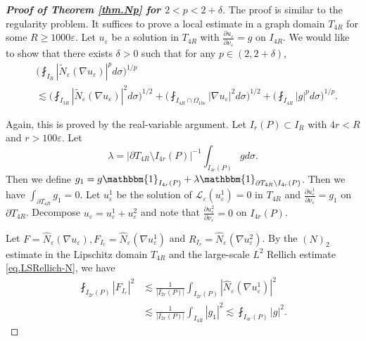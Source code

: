 \documentclass[reqno,12pt]{amsart} %
\theoremstyle{definition}
\theoremstyle{remark}
\numberwithin{equation}{section}
\newcommand{\cL}{\mathcal{L}}
\newcommand{\e}{\varepsilon}
\begin{document}
\begin{proof}[\textbf{Proof of Theorem \ref{thm.Np} for $2<p<2+\delta$}] 
The proof is similar to the regularity problem. It suffices to prove a local estimate in a graph domain $T_{4R}$ for some $R\ge 1000\e$. Let $u_\e$ be a solution in $T_{4R}$ with $\frac{\partial u_\e}{\partial \nu_\e} = g$ on $I_{4R}$. We would like to show that there exists $\delta>0$ such that for any $p\in (2,2+\delta)$,
\begin{equation}
\begin{aligned}
     & \bigg( \fint_{I_R} | \widetilde{N}_\e (\nabla u_\e)|^{p} d\sigma \bigg)^{1/{p}} \\
     & \lesssim \bigg( \fint_{I_{3R}} |\widetilde{N}_\e(\nabla u_\e)|^{2} d\sigma \bigg)^{1/{2}} + \bigg( \fint_{I_{4R}\cap \Omega_{10\e}} |\nabla u_\e|^{2} d\sigma \bigg)^{1/{2}} + \bigg( \fint_{I_{4R}} |g|^{p} d\sigma \bigg)^{1/p}. 
\end{aligned}
\end{equation}

Again, this is proved by the real-variable argument.
Let $ I_r(P) \subset I_R$ with $4r < R$ and $r>100\e$. Let 
$$\lambda = |\partial T_{4R} \setminus I_{4r}(P)|^{-1} \int_{I_{4r}(P)} g d\sigma. $$ 
Then we define $g_1 = g \mathbbm{1}_{I_{4r}(P)} + \lambda \mathbbm{1}_{\partial T_{4R} \setminus I_{4r}(P)}$. Then we have $\int_{\partial T_{4R}} g_1 = 0$. Let $u_\e^1$ be the solution of $\cL_\e(u_\e^1) = 0$ in $T_{4R}$ and $ \frac{\partial u_\e^1}{\partial \nu_\e} = g_1$ on $\partial T_{4R}$. Decompose $u_\e = u_\e^1 + u_\e^2$ and note that $\frac{\partial u_\e^2}{\partial \nu_\e} = 0$ on $I_{4r}(P)$.

Let $F = \widehat{N}_\e(\nabla u_\e), F_{I_r} = \widehat{N}_\e(\nabla u^1_\e)$ and $R_{I_r} =\widehat{N}_\e(\nabla u_\e^2)$. By the $(N)_2$ estimate in the Lipschitz domain $T_{4R}$ and the large-scale $L^2$ Rellich estimate \eqref{eq.LSRellich-N}, we have
\begin{equation}
\begin{aligned}
    \fint_{I_{2r}(P)} |F_{I_{r}}|^2 & \lesssim \frac{1}{|I_{2r}(P)|} \int_{I_{2r}(P)} |\widehat{N}_\e(\nabla u^1_\e)|^2 \\
    & \lesssim \frac{1}{|I_{2r}(P)|}\int_{I_{4R}} |g_1|^2 
    \lesssim \fint_{I_{4r}(P)} |g|^2.
\end{aligned}
\end{equation}


\end{proof}
\end{document}
